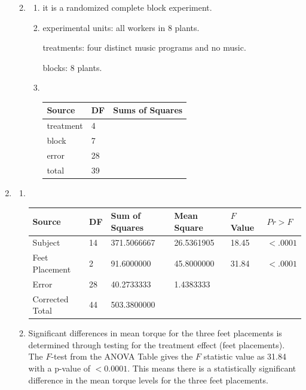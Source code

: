 \documentclass{article}
\begin{document}
\begin{enumerate}[leftmargin = 0 em, label = \arabic*., font = \bfseries]
\begin{enumerate}
\begin{enumerate}
\begin{center}
\begin{tabular}{lll}
		\end{tabular}
		\end{center}
	\end{enumerate}

	\item 
	\begin{enumerate}
		\item  it is a randomized complete block experiment.
		\item experimental units: all workers in 8 plants.

		treatments:  four distinct music programs and no music.

		blocks: 8 plants.


		\item \

		\begin{center}
		\begin{tabular}{lll}
		\toprule
		Source & DF & Sums of Squares\\
		\midrule
		treatment & 4 & \\
		block & 7 & \\
		error & 28 &\\
		total & 39&\\
		\bottomrule

		\end{tabular}
		\end{center}
	\end{enumerate}
\end{enumerate}



\newpage
		\item 
		\begin{enumerate}
			\item \ 

			\begin{center}
			\begin{tabular}{llllll}
			\toprule
			Source&DF&Sum of Squares&Mean Square&$F$ Value&$Pr > F$\\
			\midrule
Subject&14&371.5066667&26.5361905&18.45&$<.0001$\\
Feet Placement&2&91.6000000&45.8000000&31.84&$<.0001$\\
Error&28&40.2733333&1.4383333&&\\
Corrected Total&44&503.3800000&&	\\
\bottomrule
\end{tabular}
\end{center}

\item 
Significant differences in mean torque for the three feet placements is determined
through testing for the treatment effect (feet placements). The $F$-test from the ANOVA Table
gives the $F$ statistic value as 31.84 with a p-value of $< 0.0001$. This means there 
is a statistically significant difference in the mean torque levels for the three feet placements.



\end{enumerate}
\end{enumerate}
\end{document}
